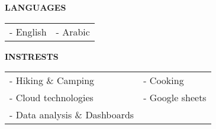 \medskip
\divider

\textcolor{VividPurple}{\textbf{LANGUAGES}}
\medskip

\begin{tabular}{ l l } 
	- English & - Arabic \\
\end{tabular}  


\divider

\textcolor{VividPurple}{\textbf{INSTRESTS}}
\medskip

\begin{tabular}{ l l } 
	- Hiking \& Camping  & - Cooking       \\
	- Cloud technologies & - Google sheets \\
	- Data analysis \& Dashboards
\end{tabular}


\medskip
\medskip

\mbox{}\hfill \small \href{https://github.com/MichaelSafwatHanna/cv}{\textcolor{accent}{\faCode}}